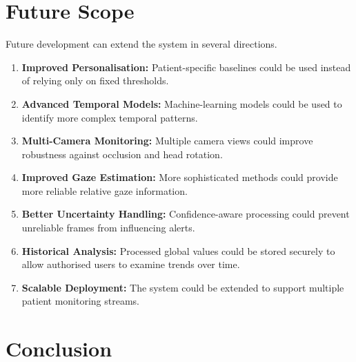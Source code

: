 \documentclass[12pt]{tietreport}
\begin{document}

\chapter{Future Scope}

Future development can extend the system in several directions.

\begin{enumerate}[leftmargin=*]

    \item \textbf{Improved Personalisation:}
    Patient-specific baselines could be used instead of relying only
    on fixed thresholds.

    \item \textbf{Advanced Temporal Models:}
    Machine-learning models could be used to identify more complex
    temporal patterns.

    \item \textbf{Multi-Camera Monitoring:}
    Multiple camera views could improve robustness against
    occlusion and head rotation.

    \item \textbf{Improved Gaze Estimation:}
    More sophisticated methods could provide more reliable relative
    gaze information.

    \item \textbf{Better Uncertainty Handling:}
    Confidence-aware processing could prevent unreliable frames from
    influencing alerts.

    \item \textbf{Historical Analysis:}
    Processed global values could be stored securely to allow
    authorised users to examine trends over time.

    \item \textbf{Scalable Deployment:}
    The system could be extended to support multiple patient
    monitoring streams.

\end{enumerate}


\chapter{Conclusion}
\end{document}
